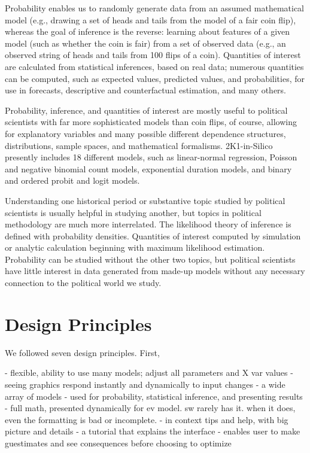 \documentclass[12pt]{article}
\theoremstyle{definition}
\begin{document}
Probability enables us to randomly generate data from an assumed mathematical model (e.g., drawing a set of heads and tails from the model of a fair coin flip), whereas the goal of inference is the reverse: learning about features of a given model (such as whether the coin is fair) from a set of observed data (e.g., an observed string of heads and tails from 100 flips of a coin). Quantities of interest are calculated from statistical inferences, based on real data; numerous quantities can be computed, such as expected values, predicted values, and probabilities, for use in forecasts, descriptive and counterfactual estimation, and many others.

Probability, inference, and quantities of interest are mostly useful to political scientists with far more sophisticated models than coin flips, of course, allowing for explanatory variables and many possible different dependence structures, distributions, sample spaces, and mathematical formalisms.  2K1-in-Silico presently includes 18 different models, such as linear-normal regression, Poisson and negative binomial count models, exponential duration models, and binary and ordered probit and logit models.

Understanding one historical period or substantive topic studied by political scientists is usually helpful in studying another, but topics in political methodology are much more interrelated.  The likelihood theory of inference is defined with probability densities. Quantities of interest computed by simulation or analytic calculation beginning with maximum likelihood estimation. Probability can be studied without the other two topics, but political scientists have little interest in data generated from made-up models without any necessary connection to the political world we study.

\section{Design Principles}

We followed seven design principles.  First, 

- flexible, ability to use many models; adjust all parameters and X var values
- seeing graphics respond instantly and dynamically to input changes
- a wide array of models
- used for probability, statistical inference, and presenting results
- full math, presented dynamically for ev model.  sw rarely has it. when it does, even the formatting is bad or incomplete.
- in context tips and help, with big picture and details
- a tutorial that explains the interface
- enables user to make guestimates and see consequences before choosing to optimize
\end{document}

